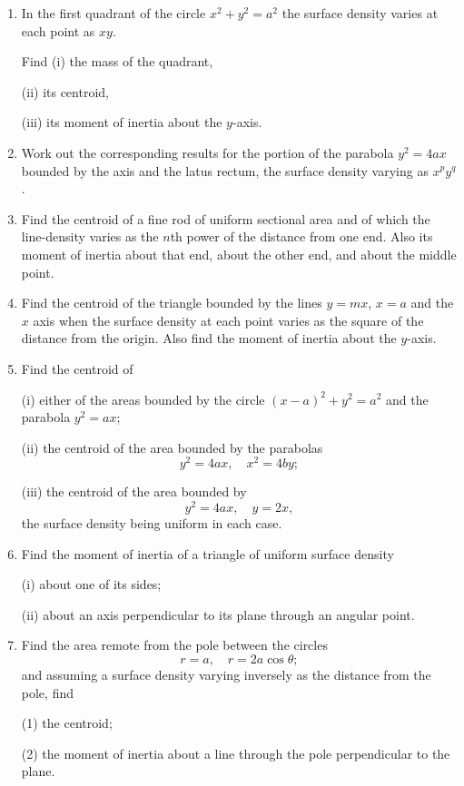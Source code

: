 \documentclass[11pt, a4paper]{article}
\begin{document}
\begin{enumerate}[leftmargin=2em]

\item In the first quadrant of the circle $x^2+y^2=a^2$ the surface density varies at each point as $xy$.

Find (i) the mass of the quadrant,

(ii) its centroid,

(iii) its moment of inertia about the $y$-axis.

\item Work out the corresponding results for the portion of the parabola $y^2=4ax$ bounded by the axis and the latus rectum, the surface density varying as $x^py^q$.

\item Find the centroid of a fine rod of uniform sectional area and of which the line-density varies as the $n$th power of the distance from one end. Also its moment of inertia about that end, about the other end, and about the middle point.

\item Find the centroid of the triangle bounded by the lines $y=mx$, $x=a$ and the $x$ axis when the surface density at each point varies as the square of the distance from the origin. Also find the moment of inertia about the $y$-axis.

\item Find the centroid of

(i) either of the areas bounded by the circle $(x-a)^2+y^2=a^2$ and the parabola $y^2=ax$;

(ii) the centroid of the area bounded by the parabolas
\[
y^2=4ax,\quad x^2=4by;
\]

(iii) the centroid of the area bounded by
\[
y^2=4ax,\quad y=2x,
\]
the surface density being uniform in each case.

\item Find the moment of inertia of a triangle of uniform surface density

(i) about one of its sides;

(ii) about an axis perpendicular to its plane through an angular point.

\item Find the area remote from the pole between the circles
\[
r=a,\quad r=2a\cos\theta;
\]
and assuming a surface density varying inversely as the distance from the pole, find

(1) the centroid;

(2) the moment of inertia about a line through the pole perpendicular to the plane.


\end{enumerate}
\end{document}
